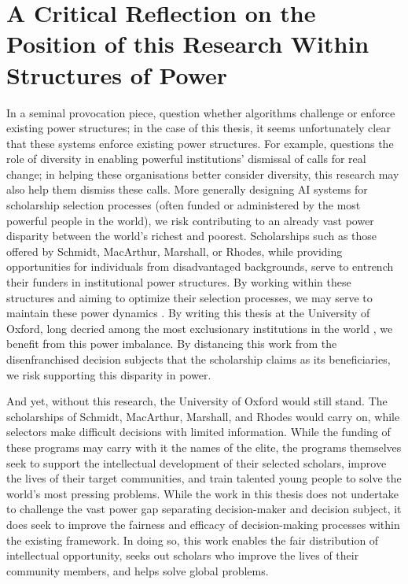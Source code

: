 \section{A Critical Reflection on the Position of this Research Within Structures of Power}\label{sec:reflexivity}
In a seminal provocation piece, \textcite{Barocas_Hood_Ziewitz_2013} question whether algorithms challenge or enforce existing power structures; in the case of this thesis, it seems unfortunately clear that these systems enforce existing power structures. For example, \textcite{Ahmed_2012} questions the role of diversity in enabling powerful institutions' dismissal of calls for real change; in helping these organisations better consider diversity, this research may also help them dismiss these calls. More generally designing AI systems for scholarship selection processes (often funded or administered by the most powerful people in the world), we risk contributing to an already vast power disparity between the world's richest and poorest. Scholarships such as those offered by Schmidt, MacArthur, Marshall, or Rhodes, while providing opportunities for individuals from disadvantaged backgrounds, serve to entrench their funders in institutional power structures. By working within these structures and aiming to optimize their selection processes, we may serve to maintain these power dynamics \cite{Ziegler_2008}. By writing this thesis at the University of Oxford, long decried among the most exclusionary institutions in the world \cite{Ziegler_2008}, we benefit from this power imbalance. By distancing this work from the disenfranchised decision subjects that the scholarship claims as its beneficiaries, we risk supporting this disparity in power. 

And yet, without this research, the University of Oxford would still stand. The scholarships of Schmidt, MacArthur, Marshall, and Rhodes would carry on, while selectors make difficult decisions with limited information. While the funding of these programs may carry with it the names of the elite, the programs themselves seek to support the intellectual development of their selected scholars, improve the lives of their target communities, and train talented young people to solve the world's most pressing problems. While the work in this thesis does not undertake to challenge the vast power gap separating decision-maker and decision subject, it does seek to improve the fairness and efficacy of decision-making processes within the existing framework. In doing so, this work enables the fair distribution of intellectual opportunity, seeks out scholars who improve the lives of their community members, and helps solve global problems.

